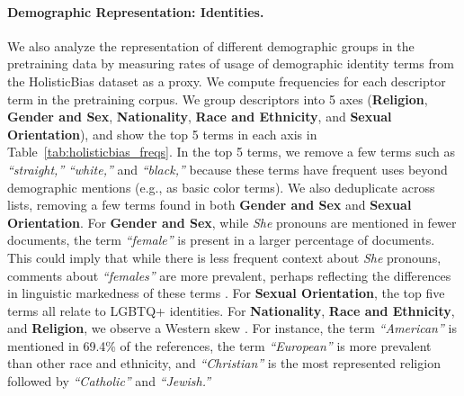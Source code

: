 \documentclass{article}
\begin{document}
\paragraph{Demographic Representation: Identities.}
We also analyze the representation of different demographic groups in the pretraining data by measuring rates of usage of demographic identity terms from the HolisticBias dataset \citep{smith2022m} as a proxy. 
We compute frequencies for each descriptor term in the pretraining corpus. We group descriptors into 5 axes (\textbf{Religion}, \textbf{Gender and Sex}, \textbf{Nationality}, \textbf{Race and Ethnicity}, and \textbf{Sexual Orientation}), and show the top 5 terms in each axis in Table~\ref{tab:holisticbias_freqs}. In the top 5 terms, we remove a few terms such as \textit{``straight,''} \textit{``white,''} and \textit{``black,''} because these terms have frequent uses beyond demographic mentions (e.g., as basic color terms). We also deduplicate across lists, removing a few terms found in both \textbf{Gender and Sex} and \textbf{Sexual Orientation}. 
For \textbf{Gender and Sex}, while \textit{She} pronouns are mentioned in fewer documents, the term \textit{``female''} is present in a larger percentage of documents. This could imply that while there is less frequent context about \textit{She} pronouns, comments about \textit{``females''} are more prevalent, perhaps reflecting the differences in linguistic markedness of these terms \citep{blodgett2021stereotyping}. For \textbf{Sexual Orientation}, the top five terms all relate to LGBTQ+ identities. For \textbf{Nationality}, \textbf{Race and Ethnicity}, and \textbf{Religion}, we observe a Western skew \citep{bhatt2022recontextualizing}. For instance, the term \textit{``American''} is mentioned in 69.4\% of the references, the term  \textit{``European''} is more prevalent than other race and ethnicity, and \textit{``Christian''} is the most represented religion followed by \textit{``Catholic''} and \textit{``Jewish.''} 
\end{document}

